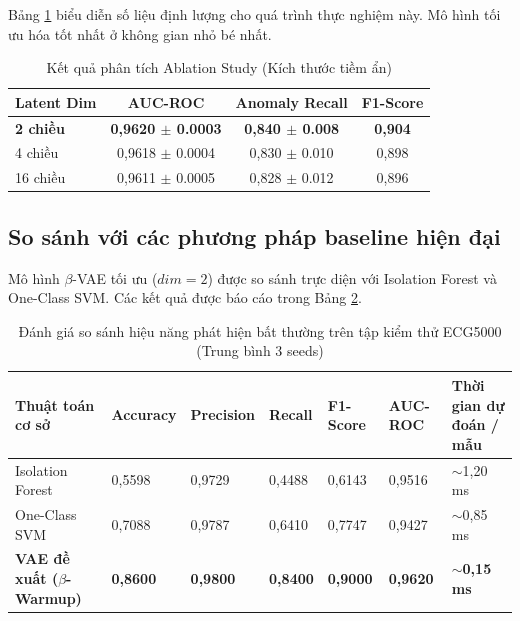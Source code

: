 \documentclass[conference]{IEEEtran}
\begin{document}
Bảng \ref{tab:ablation} biểu diễn số liệu định lượng cho quá trình thực nghiệm này. Mô hình tối ưu hóa tốt nhất ở không gian nhỏ bé nhất.

\begin{table}[htbp]
\caption{Kết quả phân tích Ablation Study (Kích thước tiềm ẩn)}
\centering
\begin{tabular}{lccc}
\toprule
\textbf{Latent Dim} & \textbf{AUC-ROC} & \textbf{Anomaly Recall} & \textbf{F1-Score} \\
\midrule
\textbf{2 chiều} & \textbf{0,9620 \(\pm\) 0.0003} & \textbf{0,840 \(\pm\) 0.008} & \textbf{0,904} \\
4 chiều & 0,9618 \(\pm\) 0.0004 & 0,830 \(\pm\) 0.010 & 0,898 \\
16 chiều & 0,9611 \(\pm\) 0.0005 & 0,828 \(\pm\) 0.012 & 0,896 \\
\bottomrule
\end{tabular}
\label{tab:ablation}
\end{table}

\subsection{So sánh với các phương pháp baseline hiện đại}
Mô hình \(\beta\)-VAE tối ưu (\(dim=2\)) được so sánh trực diện với Isolation Forest và One-Class SVM. Các kết quả được báo cáo trong Bảng \ref{tab:baseline}.

\begin{table}[htbp]
\caption{Đánh giá so sánh hiệu năng phát hiện bất thường trên tập kiểm thử ECG5000 (Trung bình 3 seeds)}
\centering
\begin{tabularx}{0.95\textwidth}{lXXXXXX}
\toprule
\textbf{Thuật toán cơ sở} & \textbf{Accuracy} & \textbf{Precision} & \textbf{Recall} & \textbf{F1-Score} & \textbf{AUC-ROC} & \textbf{Thời gian dự đoán / mẫu} \\
\midrule
Isolation Forest \cite{liu} & 0,5598 & 0,9729 & 0,4488 & 0,6143 & 0,9516 & \(\sim\)1,20 ms \\
One-Class SVM \cite{scholkopf} & 0,7088 & 0,9787 & 0,6410 & 0,7747 & 0,9427 & \(\sim\)0,85 ms \\
\textbf{VAE đề xuất (\(\beta\)-Warmup)} & \textbf{0,8600} & \textbf{0,9800} & \textbf{0,8400} & \textbf{0,9000} & \textbf{0,9620} & \textbf{\(\sim\)0,15 ms} \\
\bottomrule
\end{tabularx}
\label{tab:baseline}
\end{table}
\end{document}
